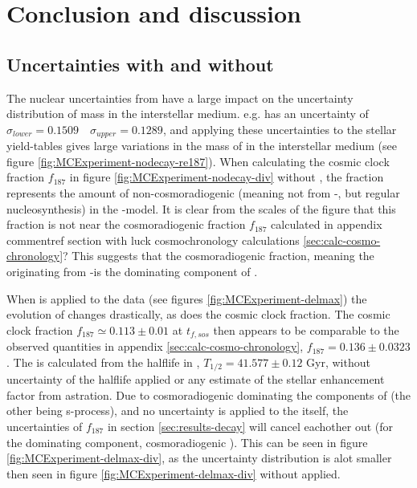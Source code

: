 \chapter{Conclusion and discussion}
\label{sec:conclusion}

\section{Uncertainties with and without \betadecay}
The nuclear uncertainties from  have a large impact on the uncertainty distribution of mass in the interstellar medium. e.g.  has an uncertainty of $\sigma_{lower}=0.1509 \quad \sigma_{upper}=0.1289$, and applying these uncertainties to the stellar yield-tables gives large variations in the mass of  in the interstellar medium (see figure \ref{fig:MCExperiment-nodecay-re187}).
When calculating the cosmic clock fraction $f_{187}$ in figure \ref{fig:MCExperiment-nodecay-div} without \betadecay, the fraction represents the amount of non-cosmoradiogenic  (meaning not from -\betadecay, but regular nucleosynthesis) in the \omegamodel-model.
It is clear from the scales of the figure that this fraction is not near the cosmoradiogenic fraction $f_{187}$ calculated in appendix comment{ref section with luck cosmochronology calculations \ref{sec:calc-cosmo-chronology}?}
This suggests that the cosmoradiogenic fraction, meaning the  originating from -\betadecay is the dominating component of .

When \betadecay is applied to the data (see figures \ref{fig:MCExperiment-delmax}) the evolution of  changes drastically, as does the cosmic clock fraction. The cosmic clock fraction $f_{187}\simeq0.113\pm0.01$ at $t_{f,sos}$ then appears to be comparable to the observed quantities in appendix \ref{sec:calc-cosmo-chronology}, $f_{187}=0.136\pm0.0323$.
The \betadecay is calculated from the halflife in , $T_{1/2}=41.577\pm0.12$ Gyr, without uncertainty of the halflife applied or any estimate of the stellar enhancement factor from astration.
Due to cosmoradiogenic  dominating the components of  (the other being s-process), and no uncertainty is applied to the \betadecay itself, the uncertainties of $f_{187}$ in section \ref{sec:results-decay} will cancel eachother out (for the dominating component, cosmoradiogenic ).
This can be seen in figure \ref{fig:MCExperiment-delmax-div}, as the uncertainty distribution is alot smaller then seen in figure \ref{fig:MCExperiment-delmax-div} without \betadecay applied.

